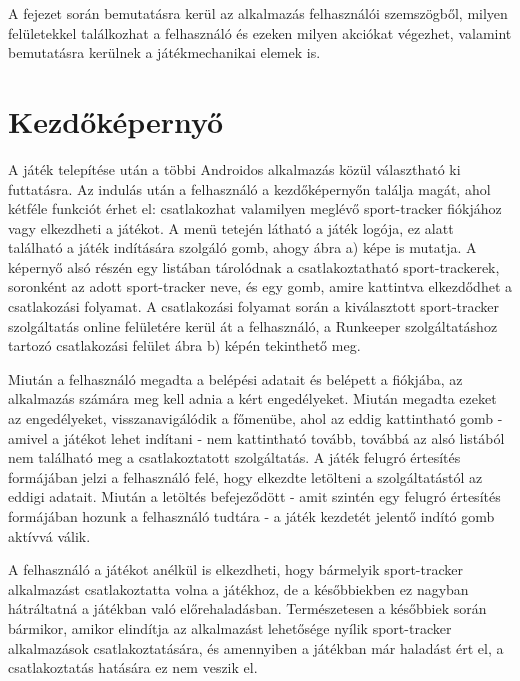 A fejezet során bemutatásra kerül az alkalmazás felhasználói szemszögből, milyen felületekkel találkozhat a felhasználó és ezeken milyen akciókat végezhet, valamint bemutatásra kerülnek a játékmechanikai elemek is.


\section{Kezdőképernyő}
\label{kezdokepernyo}

A játék telepítése után a többi Androidos alkalmazás közül választható ki futtatásra. 
Az indulás után a felhasználó a kezdőképernyőn találja magát, ahol kétféle funkciót érhet el: csatlakozhat valamilyen meglévő sport-tracker fiókjához vagy elkezdheti a játékot. 
A menü tetején látható a játék logója, ez alatt található a játék indítására szolgáló gomb, ahogy  ábra a) képe is mutatja. 
A képernyő alsó részén egy listában tárolódnak a csatlakoztatható sport-trackerek, soronként az adott sport-tracker neve, és egy gomb, amire kattintva elkezdődhet a csatlakozási folyamat. 
A csatlakozási folyamat során a kiválasztott sport-tracker szolgáltatás online felületére kerül át a felhasználó, a Runkeeper szolgáltatáshoz tartozó csatlakozási felület  ábra b) képén tekinthető meg. 

Miután a felhasználó megadta a belépési adatait és belépett a fiókjába, az alkalmazás számára meg kell adnia a kért engedélyeket. 
Miután megadta ezeket az engedélyeket, visszanavigálódik a főmenübe, ahol az eddig kattintható gomb - amivel a játékot lehet indítani - nem kattintható tovább, továbbá az alsó listából nem található meg a csatlakoztatott szolgáltatás. 
A játék felugró értesítés formájában jelzi a felhasználó felé, hogy elkezdte letölteni a szolgáltatástól az eddigi adatait. 
Miután a letöltés befejeződött - amit szintén egy felugró értesítés formájában hozunk a felhasználó tudtára - a játék kezdetét jelentő indító gomb aktívvá válik.  

A felhasználó a játékot anélkül is elkezdheti, hogy bármelyik sport-tracker alkalmazást csatlakoztatta volna a játékhoz, de a későbbiekben ez nagyban hátráltatná a játékban való előrehaladásban. 
Természetesen a későbbiek során bármikor, amikor elindítja az alkalmazást lehetősége nyílik sport-tracker alkalmazások csatlakoztatására, és amennyiben a játékban már haladást ért el, a csatlakoztatás hatására ez nem veszik el. 

